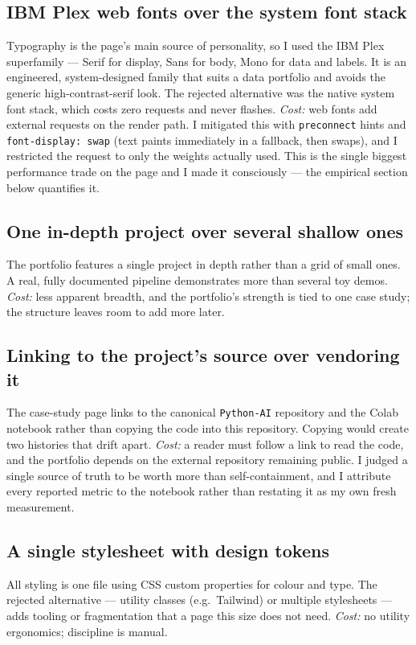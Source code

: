 \documentclass[11pt,a4paper]{article}
\begin{document}
\subsection{IBM Plex web fonts over the system font stack}
Typography is the page's main source of personality, so I used the IBM Plex
superfamily --- Serif for display, Sans for body, Mono for data and labels. It is
an engineered, system-designed family that suits a data portfolio and avoids the
generic high-contrast-serif look. The rejected alternative was the native system
font stack, which costs zero requests and never flashes. \emph{Cost:} web fonts
add external requests on the render path. I mitigated this with
\texttt{preconnect} hints and \texttt{font-display: swap} (text paints
immediately in a fallback, then swaps), and I restricted the request to only the
weights actually used. This is the single biggest performance trade on the page
and I made it consciously --- the empirical section below quantifies it.

\subsection{One in-depth project over several shallow ones}
The portfolio features a single project in depth rather than a grid of small
ones. A real, fully documented pipeline demonstrates more than several toy demos.
\emph{Cost:} less apparent breadth, and the portfolio's strength is tied to one
case study; the structure leaves room to add more later.

\subsection{Linking to the project's source over vendoring it}
The case-study page links to the canonical \texttt{Python-AI} repository and the
Colab notebook rather than copying the code into this repository. Copying would
create two histories that drift apart. \emph{Cost:} a reader must follow a link to
read the code, and the portfolio depends on the external repository remaining
public. I judged a single source of truth to be worth more than self-containment,
and I attribute every reported metric to the notebook rather than restating it as
my own fresh measurement.

\subsection{A single stylesheet with design tokens}
All styling is one file using CSS custom properties for colour and type. The
rejected alternative --- utility classes (e.g.\ Tailwind) or multiple
stylesheets --- adds tooling or fragmentation that a page this size does not
need. \emph{Cost:} no utility ergonomics; discipline is manual.
\end{document}
